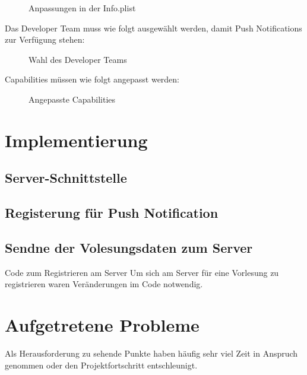 \begin{figure}[H]
	\centering
	\caption{Anpassungen in der Info.plist}
	\label{plist}
\end{figure}


Das Developer Team muss wie folgt ausgewählt werden, damit Push Notifications zur Verfügung stehen:
\begin{figure}[H]
	\centering
	\caption{Wahl des Developer Teams}
	\label{devteam}
\end{figure}


Capabilities müssen wie folgt angepasst werden:

\begin{figure}[H]
	\centering
	\caption{Angepasste Capabilities}
	\label{capabilities}
\end{figure}

\section{Implementierung}
\subsection{Server-Schnittstelle}
\subsection{Registerung für Push Notification}
\subsection{Sendne der Volesungsdaten zum Server}

	Code zum Registrieren am Server
	Um sich am Server für eine Vorlesung zu registrieren waren Veränderungen im Code notwendig.
	

\section{Aufgetretene Probleme}
Als Herausforderung zu sehende Punkte haben häufig sehr viel Zeit in Anspruch genommen oder den Projektfortschritt entschleunigt.


